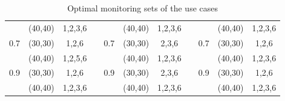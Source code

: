 \begin{table}[htbp]
{\begin{tabular}{ccccccccccc}
\multicolumn{1}{|c|}{}                     & \multicolumn{1}{c|}{(40,40)}     & \multicolumn{1}{c|}{1,2,3,6} & \multicolumn{1}{c|}{} & \multicolumn{1}{c|}{}                     & \multicolumn{1}{c|}{(40,40)}     & \multicolumn{1}{c|}{1,2,3,6} & \multicolumn{1}{c|}{} & \multicolumn{1}{c|}{}                     & \multicolumn{1}{c|}{(40,40)}     & \multicolumn{1}{c|}{1,2,3,6} \\ \cline{1-3} \cline{5-7} \cline{9-11} 
\multicolumn{1}{|c|}{\multirow{2}{*}{0.7}} & \multicolumn{1}{c|}{(30,30)}     & \multicolumn{1}{c|}{1,2,6}   & \multicolumn{1}{c|}{} & \multicolumn{1}{c|}{\multirow{2}{*}{0.7}} & \multicolumn{1}{c|}{(30,30)}     & \multicolumn{1}{c|}{2,3,6}   & \multicolumn{1}{c|}{} & \multicolumn{1}{c|}{\multirow{2}{*}{0.7}} & \multicolumn{1}{c|}{(30,30)}     & \multicolumn{1}{c|}{1,2,6}   \\ \cline{2-3} \cline{6-7} \cline{10-11} 
\multicolumn{1}{|c|}{}                     & \multicolumn{1}{c|}{(40,40)}     & \multicolumn{1}{c|}{1,2,5,6} & \multicolumn{1}{c|}{} & \multicolumn{1}{c|}{}                     & \multicolumn{1}{c|}{(40,40)}     & \multicolumn{1}{c|}{1,2,3,6} & \multicolumn{1}{c|}{} & \multicolumn{1}{c|}{}                     & \multicolumn{1}{c|}{(40,40)}     & \multicolumn{1}{c|}{1,2,3,6} \\ \cline{1-3} \cline{5-7} \cline{9-11} 
\multicolumn{1}{|c|}{\multirow{2}{*}{0.9}} & \multicolumn{1}{c|}{(30,30)}     & \multicolumn{1}{c|}{1,2,6}   & \multicolumn{1}{c|}{} & \multicolumn{1}{c|}{\multirow{2}{*}{0.9}} & \multicolumn{1}{c|}{(30,30)}     & \multicolumn{1}{c|}{2,3,6}   & \multicolumn{1}{c|}{} & \multicolumn{1}{c|}{\multirow{2}{*}{0.9}} & \multicolumn{1}{c|}{(30,30)}     & \multicolumn{1}{c|}{1,2,6}   \\ \cline{2-3} \cline{6-7} \cline{10-11} 
\multicolumn{1}{|c|}{}                     & \multicolumn{1}{c|}{(40,40)}     & \multicolumn{1}{c|}{1,2,3,6} & \multicolumn{1}{c|}{} & \multicolumn{1}{c|}{}                     & \multicolumn{1}{c|}{(40,40)}     & \multicolumn{1}{c|}{1,2,3,6} & \multicolumn{1}{c|}{} & \multicolumn{1}{c|}{}                     & \multicolumn{1}{c|}{(40,40)}     & \multicolumn{1}{c|}{1,2,3,6} \\ \cline{1-3} \cline{5-7} \cline{9-11} 
\end{tabular}%
}
\caption{Optimal monitoring sets of the use cases}
\label{tab:mdp-usecase-optiset}
\end{table}